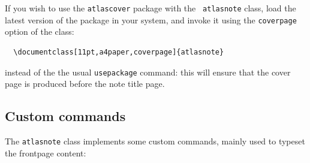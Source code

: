 \documentclass[11pt,a4paper]{atlasnote}
\begin{document}
If you wish to use the {\tt atlascover} package with the {\tt
  atlasnote} class, load the latest version of the package in your
system, and invoke it using the {\tt coverpage} option of the class:
\begin{verbatim}
  \documentclass[11pt,a4paper,coverpage]{atlasnote}
\end{verbatim}
instead of the the usual {\tt usepackage} command: this will ensure
that the cover page is produced before the note title page.

\subsection{Custom commands}

The {\tt atlasnote} class implements some custom commands, mainly
used to typeset the frontpage content:
\end{document}
